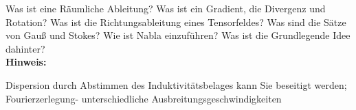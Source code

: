 \begin{question}[section=1,subsection=12,name={Räumliche Ableitung},difficulty=5,type=mdl,mode=exm,tags={}]
	Was ist eine Räumliche Ableitung? Was ist ein Gradient, die Divergenz und Rotation? Was ist die Richtungsableitung eines Tensorfeldes? Was sind die Sätze von Gauß und Stokes? Wie ist Nabla einzuführen? Was ist die Grundlegende Idee dahinter?
	\\ \textbf{Hinweis:}\\
	
\end{question}
\begin{solution}
	Dispersion durch Abstimmen des Induktivitätsbelages kann Sie beseitigt werden; Fourierzerlegung- unterschiedliche Ausbreitungsgeschwindigkeiten
\end{solution}
